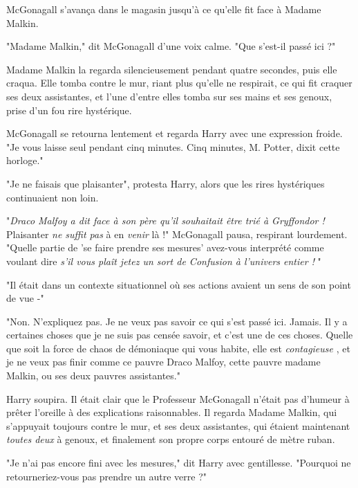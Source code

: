 McGonagall s'avança dans le magasin jusqu'à ce qu'elle fit face à Madame Malkin.

"Madame Malkin," dit McGonagall d'une voix calme. "Que s'est-il passé ici ?"

Madame Malkin la regarda silencieusement pendant quatre secondes, puis elle craqua. Elle tomba contre le mur, riant plus qu'elle ne respirait, ce qui fit craquer ses deux assistantes, et l'une d'entre elles tomba sur ses mains et ses genoux, prise d'un fou rire hystérique.

McGonagall se retourna lentement et regarda Harry avec une expression froide. "Je vous laisse seul pendant cinq minutes. Cinq minutes, M. Potter, dixit cette horloge."

"Je ne faisais que plaisanter", protesta Harry, alors que les rires hystériques continuaient non loin.

"\emph{Draco Malfoy a dit face à son père qu'il souhaitait être trié à Gryffondor ! } Plaisanter \emph{ne suffit pas } à en \emph{venir}  là !" McGonagall pausa, respirant lourdement. "Quelle partie de 'se faire prendre ses mesures' avez-vous interprété comme voulant dire \emph{s'il vous plaît jetez un sort de Confusion à l'univers entier !} "

"Il était dans un contexte situationnel où ses actions avaient un sens de son point de vue -"

"Non. N'expliquez pas. Je ne veux pas savoir ce qui s'est passé ici. Jamais. Il y a certaines choses que je ne suis pas censée savoir, et c'est une de ces choses. Quelle que soit la force de chaos de démoniaque qui vous habite, elle est \emph{contagieuse} , et je ne veux pas finir comme ce pauvre Draco Malfoy, cette pauvre madame Malkin, ou ses deux pauvres assistantes."

Harry soupira. Il était clair que le Professeur McGonagall n'était pas d'humeur à prêter l'oreille à des explications raisonnables. Il regarda Madame Malkin, qui s'appuyait toujours contre le mur, et ses deux assistantes, qui étaient maintenant \emph{toutes deux}  à genoux, et finalement son propre corps entouré de mètre ruban.

"Je n'ai pas encore fini avec les mesures," dit Harry avec gentillesse. "Pourquoi ne retourneriez-vous pas prendre un autre verre ?"

